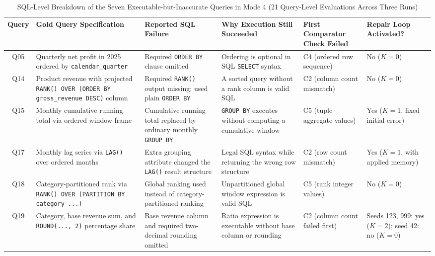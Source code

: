 \begin{table}[t]
\centering
\caption{SQL-Level Breakdown of the Seven Executable-but-Inaccurate Queries in Mode 4 (21 Query-Level Evaluations Across Three Runs)}
\label{tab:divergent_queries}
\footnotesize
\setlength{\tabcolsep}{3.5pt}
\renewcommand{\arraystretch}{1.04}
\begin{tabularx}{\textwidth}{@{}c >{\raggedright\arraybackslash}p{3.3cm} >{\raggedright\arraybackslash}p{3.5cm} >{\raggedright\arraybackslash}p{2.8cm} >{\raggedright\arraybackslash}p{2.3cm} >{\raggedright\arraybackslash}X@{}}
\toprule
\textbf{Query} & \textbf{Gold Query Specification} & \textbf{Reported SQL Failure} & \textbf{Why Execution Still Succeeded} & \textbf{First Comparator Check Failed} & \textbf{Repair Loop Activated?} \\
\midrule
Q05 & Quarterly net profit in 2025 ordered by \texttt{calendar\_quarter} & Required \texttt{ORDER BY} clause omitted & Ordering is optional in SQL \texttt{SELECT} syntax & C4 (ordered row sequence) & No ($K=0$) \\
Q14 & Product revenue with projected \texttt{RANK() OVER (ORDER BY gross\_revenue DESC)} column & Required \texttt{RANK()} output missing; used plain \texttt{ORDER BY} & A sorted query without a rank column is valid SQL & C2 (column count mismatch) & No ($K=0$) \\
Q15 & Monthly cumulative running total via ordered window frame & Cumulative running total replaced by ordinary monthly \texttt{GROUP BY} & \texttt{GROUP BY} executes without computing a cumulative window & C5 (tuple aggregate values) & Yes ($K=1$, fixed initial error) \\
Q17 & Monthly lag series via \texttt{LAG()} over ordered months & Extra grouping attribute changed the \texttt{LAG()} result structure & Legal SQL syntax while returning the wrong row structure & C2 (row count mismatch) & Yes ($K=1$, with applied memory) \\
Q18 & Category-partitioned rank via \texttt{RANK() OVER (PARTITION BY category ...)} & Global ranking used instead of category-partitioned ranking & Unpartitioned global window expression is valid SQL & C5 (rank integer values) & No ($K=0$) \\
Q19 & Category, base revenue sum, and \texttt{ROUND(..., 2)} percentage share & Base revenue column and required two-decimal rounding omitted & Ratio expression is executable without base column or rounding & C2 (column count failed first) & Seeds 123, 999: yes ($K=2$); seed 42: no ($K=0$) \\

\end{tabularx}
\end{table}
